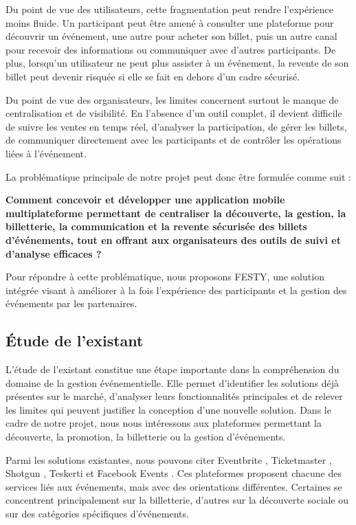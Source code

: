 Du point de vue des utilisateurs, cette fragmentation peut rendre l'expérience moins fluide. Un participant peut être amené à consulter une plateforme pour découvrir un événement, une autre pour acheter son billet, puis un autre canal pour recevoir des informations ou communiquer avec d'autres participants. De plus, lorsqu'un utilisateur ne peut plus assister à un événement, la revente de son billet peut devenir risquée si elle se fait en dehors d'un cadre sécurisé.

Du point de vue des organisateurs, les limites concernent surtout le manque de centralisation et de visibilité. En l'absence d'un outil complet, il devient difficile de suivre les ventes en temps réel, d'analyser la participation, de gérer les billets, de communiquer directement avec les participants et de contrôler les opérations liées à l'événement.

La problématique principale de notre projet peut donc être formulée comme suit :

\textbf{Comment concevoir et développer une application mobile multiplateforme permettant de centraliser la découverte, la gestion, la billetterie, la communication et la revente sécurisée des billets d'événements, tout en offrant aux organisateurs des outils de suivi et d'analyse efficaces ?}

Pour répondre à cette problématique, nous proposons FESTY, une solution intégrée visant à améliorer à la fois l'expérience des participants et la gestion des événements par les partenaires.

\subsection{Étude de l’existant}
L'étude de l'existant constitue une étape importante dans la compréhension du domaine de la gestion événementielle. Elle permet d'identifier les solutions déjà présentes sur le marché, d'analyser leurs fonctionnalités principales et de relever les limites qui peuvent justifier la conception d'une nouvelle solution. Dans le cadre de notre projet, nous nous intéressons aux plateformes permettant la découverte, la promotion, la billetterie ou la gestion d'événements.

Parmi les solutions existantes, nous pouvons citer Eventbrite \cite{REF-EVENTBRITE}, Ticketmaster \cite{REF-TICKETMASTER}, Shotgun \cite{REF-SHOTGUN}, Teskerti \cite{REF-TESKERTI} et Facebook Events \cite{REF-FACEBOOK-EVENTS}. Ces plateformes proposent chacune des services liés aux événements, mais avec des orientations différentes. Certaines se concentrent principalement sur la billetterie, d'autres sur la découverte sociale ou sur des catégories spécifiques d'événements.

